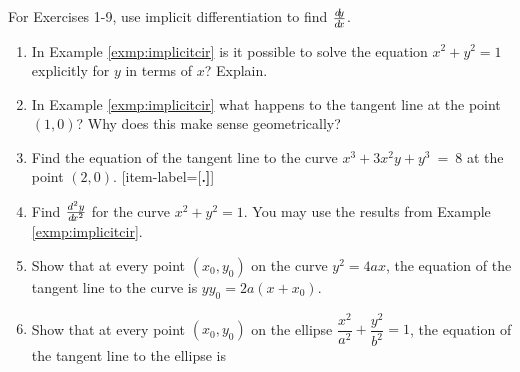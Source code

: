 \startexercises\label{sec3dot4}
{\small
{}

\par\noindent For Exercises 1-9, use implicit differentiation to find $\frac{d\negmedspace y}{d\!x}$.

\begin{enumerate}[item-label={\bfseries \arabic*.}]
  \item In Example \ref{exmp:implicitcir} is it possible to solve the equation
  $x^2 + y^2 = 1$ explicitly for $y$ in terms of $x$? Explain.
  \item In Example \ref{exmp:implicitcir} what happens to the tangent line
   at the point $(1,0)$? Why does this make sense geometrically?
  \item Find the equation of the tangent line to the curve
    $x^3 + 3x^2 y + y^3 ~=~ 8$ at the point $(2,0)$.
[item-label={{[\bfseries \arabic*.]}}]
 \item Find $\frac{d^2y}{d\!x^2}$ for the curve $x^2 + y^2 = 1$. You may use the
  results from Example \ref{exmp:implicitcir}.
 \item Show that at every point $(x_0,y_0)$ on the curve $y^2 = 4ax$, the
  equation of the tangent line to the curve is $y y_0 = 2a(x + x_0)$.
 \item\label{exer:elliptan} Show that at every point $(x_0,y_0)$ on the ellipse
  $\dfrac{x^2}{a^2} + \dfrac{y^2}{b^2} = 1$,
  the equation of the  tangent line to the ellipse is

\end{enumerate}}
